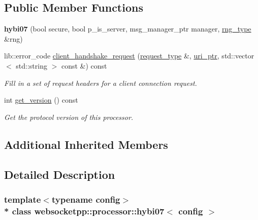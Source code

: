 \subsection*{Public Member Functions}
\begin{DoxyCompactItemize}
\item 
{\bfseries hybi07} (bool secure, bool p\+\_\+is\+\_\+server, msg\+\_\+manager\+\_\+ptr manager, \hyperlink{classwebsocketpp_1_1random_1_1none_1_1int__generator}{rng\+\_\+type} \&rng)\hypertarget{classwebsocketpp_1_1processor_1_1hybi07_a1e77a4eb4842277d510fd761fea40b0f}{}\label{classwebsocketpp_1_1processor_1_1hybi07_a1e77a4eb4842277d510fd761fea40b0f}

\item 
lib\+::error\+\_\+code \hyperlink{classwebsocketpp_1_1processor_1_1hybi07_a9742c622a7b1b5d54daa03a2fe0b060b}{client\+\_\+handshake\+\_\+request} (\hyperlink{classwebsocketpp_1_1http_1_1parser_1_1request}{request\+\_\+type} \&, \hyperlink{namespacewebsocketpp_aae370ea5ac83a8ece7712cb39fc23f5b}{uri\+\_\+ptr}, std\+::vector$<$ std\+::string $>$ const \&) const
\begin{DoxyCompactList}\small\item\em Fill in a set of request headers for a client connection request. \end{DoxyCompactList}\item 
int \hyperlink{classwebsocketpp_1_1processor_1_1hybi07_a8274e10147072c358a282d43cdcb264d}{get\+\_\+version} () const\hypertarget{classwebsocketpp_1_1processor_1_1hybi07_a8274e10147072c358a282d43cdcb264d}{}\label{classwebsocketpp_1_1processor_1_1hybi07_a8274e10147072c358a282d43cdcb264d}

\begin{DoxyCompactList}\small\item\em Get the protocol version of this processor. \end{DoxyCompactList}\end{DoxyCompactItemize}
\subsection*{Additional Inherited Members}


\subsection{Detailed Description}
\subsubsection*{template$<$typename config$>$\\*
class websocketpp\+::processor\+::hybi07$<$ config $>$}

